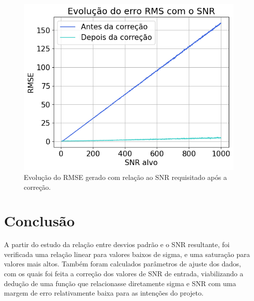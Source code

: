 \documentclass{article}
\begin{document}
\begin{figure} [H]
    \includegraphics[scale=0.5]{evolucao-rmse.png}
    \centering
    \caption{Evolução do RMSE gerado com relação ao SNR requisitado após a correção.}
    \label{fig:8}
\end{figure}

\section{Conclusão}

A partir do estudo da relação entre desvios padrão e o SNR resultante, 
foi verificada uma relação linear para valores baixos de sigma, e uma 
saturação para valores mais altos. Também foram calculados 
parâmetros de ajuste dos dados, com os quais foi feita a correção dos 
valores de SNR de entrada, viabilizando a dedução de uma função que 
relacionasse diretamente sigma e SNR com uma margem de erro 
relativamente baixa para as intenções do projeto.






\end{document}
